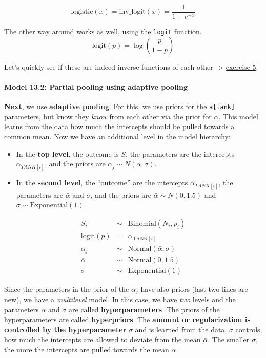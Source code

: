 \documentclass[
]{article}
\providecommand{\tightlist}{%
  \setlength{\itemsep}{0pt}\setlength{\parskip}{0pt}}
\begin{document}
\[
\mathrm{logistic}(x) = \mathrm{inv\_logit}(x) = \frac{1}{1 + e^{-x}}
\]

The other way around works as well, using the \texttt{logit} function.
\[\text{logit}(p) = \log\left( \frac{p}{1 - p} \right)\]

Let's quickly see if these are indeed inverse functions of each other
-\textgreater{} \hyperref[exercise5_LMM]{exercise 5}.

\paragraph{Model 13.2: Partial pooling using adaptive
pooling}\label{model13_2}

\textbf{Next}, we use \textbf{adaptive pooling}. For this, we use priors
for the \texttt{a{[}tank{]}} parameters, but know they \emph{know} from
each other via the prior for \(\bar{\alpha}\). This model learns from
the data how much the intercepts should be pulled towards a common mean.
Now we have an additional level in the model hierarchy:

\begin{itemize}
\tightlist
\item
  In the \textbf{top level}, the outcome is \(S\), the parameters are
  the intercepts \(\alpha_{TANK[i]}\), and the priors are
  \(\alpha_j \sim N(\bar{\alpha}, \sigma)\).
\item
  In the \textbf{second level}, the ``outcome'' are the intercepts
  \(\alpha_{TANK[i]}\), the parameters are \(\bar{\alpha}\) and
  \(\sigma\), and the priors are \(\bar{\alpha} \sim N(0, 1.5)\) and
  \(\sigma \sim \text{Exponential}(1)\).
\end{itemize}

\[
\begin{array}{rcl}
S_i &\sim& \text{Binomial}(N_i, p_i) \\
\text{logit}(p) &=& \alpha_{\text{TANK}[i]} \\
\alpha_j &\sim& \text{Normal}(\bar{\alpha}, \sigma)\\
\bar{\alpha} &\sim& \text{Normal}(0, 1.5)\\
\sigma &\sim& \text{Exponential}(1)
\end{array}
\]

Since the parameters in the prior of the \(\alpha_j\) have also priors
(last two lines are new), we have a \emph{multilevel} model. In this
case, we have \emph{two} levels and the parameters \(\bar{\alpha}\) and
\(\sigma\) are called \textbf{hyperparameters}. The priors of the
hyperparameters are called \textbf{hyperpriors}. The \textbf{amount or
regularization is controlled by the hyperparameter} \(\sigma\) and is
learned from the data. \(\sigma\) controls, how much the intercepts are
allowed to deviate from the mean \(\bar{\alpha}\). The smaller
\(\sigma\), the more the intercepts are pulled towards the mean
\(\bar{\alpha}\).
\end{document}

